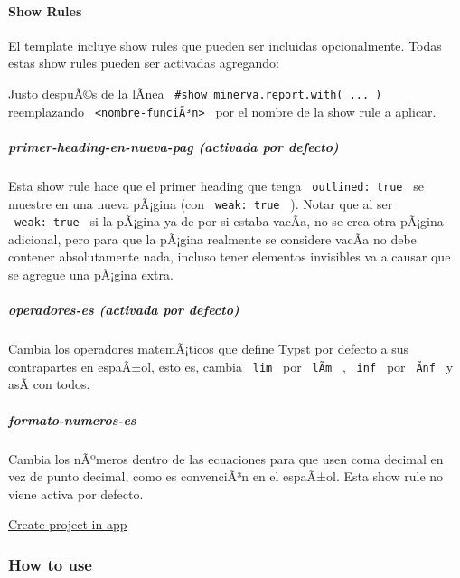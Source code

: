 \paragraph{Show Rules}\label{show-rules}

El template incluye show rules que pueden ser incluidas opcionalmente.
Todas estas show rules pueden ser activadas agregando:

\begin{Shaded}
\begin{Highlighting}[]
\end{Highlighting}
\end{Shaded}

Justo despuÃ©s de la lÃ­nea
\texttt{\ \#show\ minerva.report.with(\ ...\ )\ } reemplazando
\texttt{\ \textless{}nombre-funciÃ³n\textgreater{}\ } por el nombre de
la show rule a aplicar.

\subparagraph{primer-heading-en-nueva-pag (activada por
defecto)}\label{primer-heading-en-nueva-pag-activada-por-defecto}

Esta show rule hace que el primer heading que tenga
\texttt{\ outlined:\ true\ } se muestre en una nueva pÃ¡gina (con
\texttt{\ weak:\ true\ } ). Notar que al ser \texttt{\ weak:\ true\ } si
la pÃ¡gina ya de por si estaba vacÃ­a, no se crea otra pÃ¡gina adicional,
pero para que la pÃ¡gina realmente se considere vacÃ­a no debe contener
absolutamente nada, incluso tener elementos invisibles va a causar que
se agregue una pÃ¡gina extra.

\subparagraph{operadores-es (activada por
defecto)}\label{operadores-es-activada-por-defecto}

Cambia los operadores matemÃ¡ticos que define Typst por defecto a sus
contrapartes en espaÃ±ol, esto es, cambia \texttt{\ lim\ } por
\texttt{\ lÃ­m\ } , \texttt{\ inf\ } por \texttt{\ Ã­nf\ } y asÃ­ con
todos.

\subparagraph{formato-numeros-es}\label{formato-numeros-es}

Cambia los nÃºmeros dentro de las ecuaciones para que usen coma decimal
en vez de punto decimal, como es convenciÃ³n en el espaÃ±ol. Esta show
rule no viene activa por defecto.

\href{/app?template=minerva-report-fcfm&version=0.2.1}{Create project in
app}

\subsubsection{How to use}\label{how-to-use}

